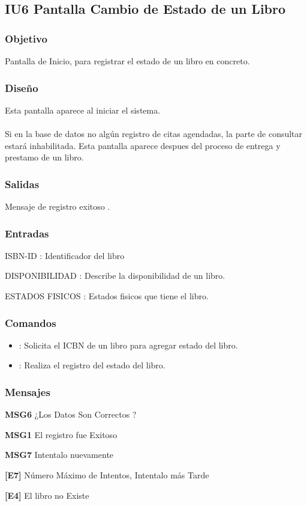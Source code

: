 \newpage
\subsection{IU6 Pantalla Cambio de Estado de un Libro}

\subsubsection{Objetivo}
	Pantalla de Inicio, para registrar el estado de un libro en concreto.

\subsubsection{Diseño}
	Esta pantalla aparece al iniciar el sistema.  \\\\
	Si en la base de datos no algún registro de citas agendadas, la parte de consultar estará inhabilitada. 
	Esta pantalla aparece despues del proceso de entrega y prestamo de un libro.


\subsubsection{Salidas}
	\begin{Citemize}
		\item Mensaje de registro exitoso . 
	\end{Citemize}
	
\subsubsection{Entradas}
	\begin{Citemize}
		\item ISBN-ID : Identificador del libro
		\item DISPONIBILIDAD : Describe la disponibilidad de un libro.
		\item ESTADOS FISICOS : Estados fisicos que tiene el libro.
	\end{Citemize}

\subsubsection{Comandos} 
\begin{itemize}
	\item {}: Solicita el ICBN de un libro para agregar estado del libro.
	\item {}: Realiza el registro del estado del libro.
\end{itemize}

\subsubsection{Mensajes}
	\begin{Citemize}
		\item {\bf  MSG6} ¿Los Datos Son Correctos ?
		\item {\bf  MSG1} El registro fue Exitoso
		\item {\bf  MSG7} Intentalo nuevamente
		\item {\bf  [E7]} Número Máximo de Intentos, Intentalo más Tarde
		 \item {\bf [E4]} El libro no Existe
	\end{Citemize}
